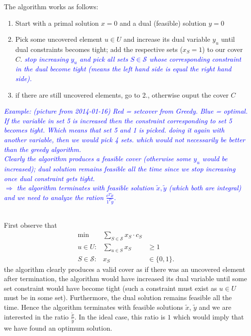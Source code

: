 \documentclass{article}
\begin{document}
The algorithm works as follows:
\begin{enumerate}
\item Start with a primal solution $x=0$ and a dual (feasible) solution $y=0$
\item Pick some uncovered element $u\in U$ and increase its dual variable $y_u$ until dual
		constraints becomes tight; add the respective sets ($x_S=1$) to our cover $C$. \textcolor{blue}{\emph{stop increasing $y_u$ and pick all sets $S \in \mathcal{S}$ whose corresponding constraint in the dual become tight (means the left hand side is equal the right hand side).}}
\item if there are still uncovered elements, go to 2., otherwise ouput the cover $C$
\end{enumerate}

\textcolor{blue}{\emph{Example: (picture from 2014-01-16)
Red = setcover from Greedy. Blue = optimal. If the variable in set 5 is increased then the constraint corresponding to set 5 becomes tight. Which means that set 5 and 1 is picked. doing it again with another variable, then we would pick 4 sets. which would not necessarily be better than the greedy algorithm.\\Clearly the algorithm produces a feasible cover (otherwise some $y_u$ would be increased); dual solution remains feasible all the time since we stop increasing once dual constraint gets tight.\\ $\Rightarrow$ the algorithm terminates with feasible solution $\widetilde{x}, \widetilde{y}$ (which both are integral) and we need to analyze the ration $\frac{c^T \widetilde{x}}{1^T \widetilde{y}}$.}}

\ \\

First observe that\begin{eqnarray}\label{SCILP}
\mbox{min} & \displaystyle \sum_{S\in \mathcal{S}} x_S \cdot c_S\\
 u\in U: & \displaystyle \sum_{u\in S} x_S  & \geq 1 \nonumber\\
 S \in \mathcal{S}: & x_S  & \in \{0,1\}. \nonumber
\end{eqnarray} the algorithm clearly produces a valid cover as if there was an uncovered element after termination, the algorithm would have increased its dual variable until some set constraint would have become tight (such a constraint must exist as $u\in U$ must be in some set). Furthermore, the dual solution remains feasible all the time. Hence the algorithm terminates with feasible solutions $\widetilde{x}$, $\widetilde{y}$ and we are interested in the ratio $\frac{\widetilde{x}}{\widetilde{y}}$. In the ideal case, this ratio is $1$ which would imply that we have found an optimum solution.
\end{document}
